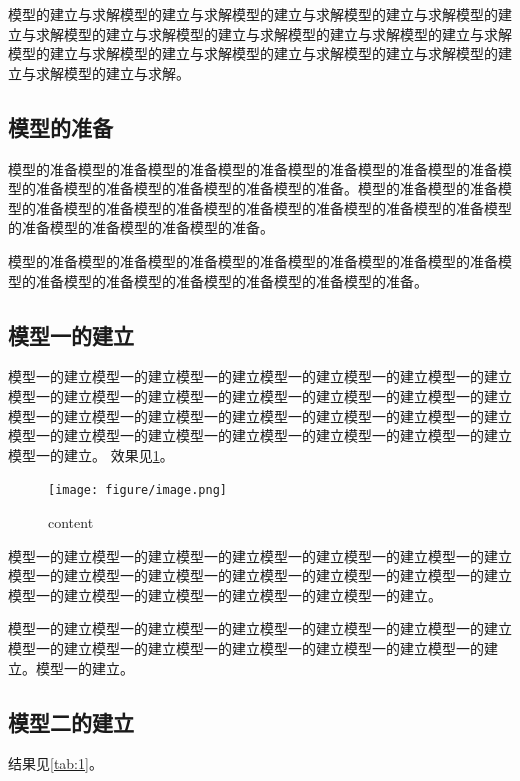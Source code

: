 \documentclass{MMCStyle}
\begin{document}
模型的建立与求解模型的建立与求解模型的建立与求解模型的建立与求解模型的建立与求解模型的建立与求解模型的建立与求解模型的建立与求解模型的建立与求解模型的建立与求解模型的建立与求解模型的建立与求解模型的建立与求解模型的建立与求解模型的建立与求解。
	\subsection{模型的准备}
模型的准备模型的准备模型的准备模型的准备模型的准备模型的准备模型的准备模型的准备模型的准备模型的准备模型的准备模型的准备。模型的准备模型的准备模型的准备模型的准备模型的准备模型的准备模型的准备模型的准备模型的准备模型的准备模型的准备模型的准备模型的准备。

模型的准备模型的准备模型的准备模型的准备模型的准备模型的准备模型的准备模型的准备模型的准备模型的准备模型的准备模型的准备模型的准备。

	\subsection{模型一的建立}
 模型一的建立模型一的建立模型一的建立模型一的建立模型一的建立模型一的建立模型一的建立模型一的建立模型一的建立模型一的建立模型一的建立模型一的建立模型一的建立模型一的建立模型一的建立模型一的建立模型一的建立模型一的建立模型一的建立模型一的建立模型一的建立模型一的建立模型一的建立模型一的建立模型一的建立。
	效果见\cref{fig:1}。
	\begin{figure}[h]
		\centering
		\texttt{[image: figure/image.png]}
		\caption{content}\label{fig:1}
	\end{figure}
 模型一的建立模型一的建立模型一的建立模型一的建立模型一的建立模型一的建立模型一的建立模型一的建立模型一的建立模型一的建立模型一的建立模型一的建立模型一的建立模型一的建立模型一的建立模型一的建立模型一的建立。

 模型一的建立模型一的建立模型一的建立模型一的建立模型一的建立模型一的建立模型一的建立模型一的建立模型一的建立模型一的建立模型一的建立模型一的建立。模型一的建立。
	\subsection{模型二的建立}
 
	结果见\cref{tab:1}。
 
\end{document}
